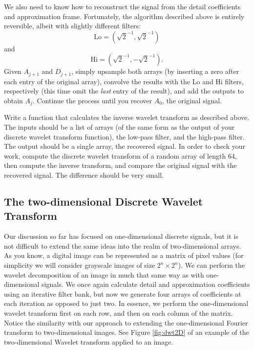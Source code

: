 We also need to know how to reconstruct the signal from the detail coefficients and
approximation frame. Fortunately, the algorithm described above is entirely reversible,
albeit with slightly different filters:
$$\text{Lo} = (\sqrt{2}^{-1}, \sqrt{2}^{-1})$$ and
$$\text{Hi} = (\sqrt{2}^{-1}, -\sqrt{2}^{-1}).$$
Given $A_{j+1}$ and $D_{j+1}$, simply upsample both arrays (by inserting a zero after
each entry of the original array), convolve the results
with the Lo and Hi filters, respectively (this time omit the \emph{last} entry of the
result), and add the outputs to obtain $A_j$. Continue the
process until you recover $A_0$, the original signal.
\begin{problem}
Write a function that calculates the inverse wavelet transform as described above.
The inputs should be a list of arrays (of the same form as the output of your discrete
wavelet transform function), the low-pass filter, and the high-pass filter. The output
should be a single array, the recovered signal. In order to check your work, compute
the discrete wavelet transform of a random array of length 64, then compute the inverse
transform, and compare the original signal with the recovered signal. The difference
should be very small.
\end{problem}

\subsection*{The two-dimensional Discrete Wavelet Transform}
Our discussion so far has focused on one-dimensional
discrete signals, but it is not difficult to extend the same ideas into the
realm of two-dimensional arrays. As you know, a digital image can be represented
as a matrix of pixel values (for simplicity we will consider grayscale images of
size $2^n \times 2^n$). We can perform the wavelet decomposition of
an image in much that same way as with one-dimensional signals. We once again
calculate detail and approximation coefficients using an iterative filter
bank, but now we generate four arrays of coefficients at each iteration as opposed to
just two. In essence, we perform the one-dimensional wavelet transform first on each
row, and then on each column of the matrix. Notice the similarity with our approach
to extending the one-dimensional Fourier transform to two-dimensional images. See
Figure \ref{fig:dwt2D} of an example of the two-dimensional Wavelet transform applied
to an image.

